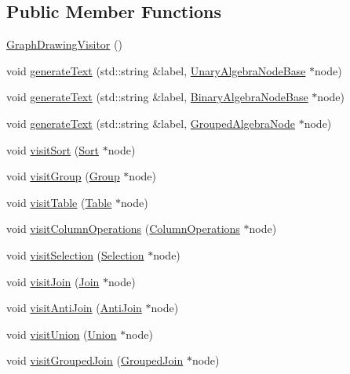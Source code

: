 \subsection*{Public Member Functions}
\begin{DoxyCompactItemize}
\item 
\hyperlink{class_graph_drawing_visitor_a9d02755cb6c2b10984a573a28751ed8a}{Graph\+Drawing\+Visitor} ()
\item 
void \hyperlink{class_graph_drawing_visitor_a613ff576e75d1bf181b5786a3b7eec63}{generate\+Text} (std\+::string \&label, \hyperlink{class_unary_algebra_node_base}{Unary\+Algebra\+Node\+Base} $\ast$node)
\item 
void \hyperlink{class_graph_drawing_visitor_a4cd34c4d34ae0a9fb1cefc801010db91}{generate\+Text} (std\+::string \&label, \hyperlink{class_binary_algebra_node_base}{Binary\+Algebra\+Node\+Base} $\ast$node)
\item 
void \hyperlink{class_graph_drawing_visitor_a67f47186f477b41da99574dc83ae2cee}{generate\+Text} (std\+::string \&label, \hyperlink{class_grouped_algebra_node}{Grouped\+Algebra\+Node} $\ast$node)
\item 
void \hyperlink{class_graph_drawing_visitor_aae222309bf242fc78da5add861cfde20}{visit\+Sort} (\hyperlink{class_sort}{Sort} $\ast$node)
\item 
void \hyperlink{class_graph_drawing_visitor_aabe646e1bc301a127722a54568479653}{visit\+Group} (\hyperlink{class_group}{Group} $\ast$node)
\item 
void \hyperlink{class_graph_drawing_visitor_a396774ef87bd463ac1a588fef83b885a}{visit\+Table} (\hyperlink{class_table}{Table} $\ast$node)
\item 
void \hyperlink{class_graph_drawing_visitor_a8cc0865d330a29411e83261205382eeb}{visit\+Column\+Operations} (\hyperlink{class_column_operations}{Column\+Operations} $\ast$node)
\item 
void \hyperlink{class_graph_drawing_visitor_a8c533a1dc5b55e26608615ff392e384b}{visit\+Selection} (\hyperlink{class_selection}{Selection} $\ast$node)
\item 
void \hyperlink{class_graph_drawing_visitor_a77fbec744cd6a2ac39e22120114c7edd}{visit\+Join} (\hyperlink{class_join}{Join} $\ast$node)
\item 
void \hyperlink{class_graph_drawing_visitor_ae25e72a771d8ec5949caa0a92a1e61aa}{visit\+Anti\+Join} (\hyperlink{class_anti_join}{Anti\+Join} $\ast$node)
\item 
void \hyperlink{class_graph_drawing_visitor_af0a1bb8a0ba7f47a89a8ae01288af625}{visit\+Union} (\hyperlink{class_union}{Union} $\ast$node)
\item 
void \hyperlink{class_graph_drawing_visitor_a4d92f0106ac1d8035498c8b5e1490919}{visit\+Grouped\+Join} (\hyperlink{class_grouped_join}{Grouped\+Join} $\ast$node)
\end{DoxyCompactItemize}
